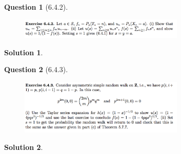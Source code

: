 \documentclass[11pt]{article}
\theoremstyle{plain}
\theoremstyle{quest}
\newtheorem*{question}{Question}
\newtheorem*{solution}{Solution}
\begin{document}
\newpage

\begin{question}[6.4.2]
\hfill
\begin{figure}[h!]
  \centering
    \includegraphics[width=0.7\textwidth]{d-6-4-2.png}
\end{figure}
\end{question}
\begin{solution} \hfill \\
\end{solution}

\newpage

\begin{question}[6.4.3]
\hfill
\begin{figure}[h!]
  \centering
    \includegraphics[width=0.7\textwidth]{d-6-4-3.png}
\end{figure}
\end{question}
\begin{solution} \hfill \\
\end{solution}

\newpage
\end{document}
